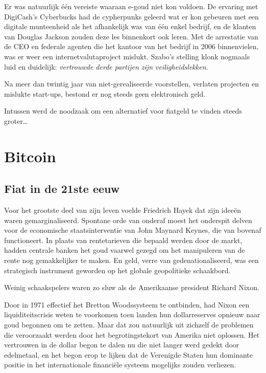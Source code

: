\documentclass[
  a5paper,
  smalldemyvopaper,11pt,twoside,onecolumn,openright,extrafontsizes,
hidelinks]{memoir}
\begin{document}
Er was natuurlijk één vereiste waaraan e-goud niet kon voldoen. De
ervaring met DigiCash's Cyberbucks had de cypherpunks geleerd wat er kon
gebeuren met een digitale munteenheid als het afhankelijk was van één
enkel bedrijf, en de klanten van Douglas Jackson zouden deze les
binnenkort ook leren. Met de arrestatie van de CEO en federale agenten
die het kantoor van het bedrijf in 2006 binnenvielen, was er weer een
internetvalutaproject mislukt. Szabo's stelling klonk nogmaals luid en
duidelijk: \emph{vertrouwde derde partijen zijn veiligheidslekken}.

Na meer dan twintig jaar van niet-gerealiseerde voorstellen, verlaten
projecten en mislukte start-ups, bestond er nog steeds geen elektronisch
geld.

Intussen werd de noodzaak om een alternatief voor fiatgeld te vinden
steeds groter\ldots{}

\part{Bitcoin}

\chapter{Fiat in de 21ste eeuw}\label{fiat-in-de-21ste-eeuw}

Voor het grootste deel van zijn leven voelde Friedrich Hayek dat zijn
ideeën waren gemarginaliseerd. Spontane orde van onderaf moest het
onderspit delven voor de economische staatsinterventie van John Maynard
Keynes, die van bovenaf functioneert. In plaats van rentetarieven die
bepaald werden door de markt, hadden centrale banken het goud vaarwel
gezegd om het manipuleren van de rente nog gemakkelijker te maken. En
geld, verre van gedenationaliseerd, was een strategisch instrument
geworden op het globale geopolitieke schaakbord.

Weinig schaakspelers waren zo sluw als de Amerikaanse president Richard
Nixon.

Door in 1971 effectief het Bretton Woodssysteem te ontbinden, had Nixon
een liquiditeitscrisis weten te voorkomen toen landen hun dollarreserves
opnieuw naar goud begonnen om te zetten. Maar dat zou natuurlijk uit
zichzelf de problemen die veroorzaakt werden door het begrotingstekort
van Amerika niet oplossen. Het vertrouwen in de dollar begon te dalen nu
die niet langer werd gedekt door edelmetaal, en het begon erop te lijken
dat de Verenigde Staten hun dominante positie in het internationale
financiële systeem mogelijks zouden verliezen.
\end{document}

